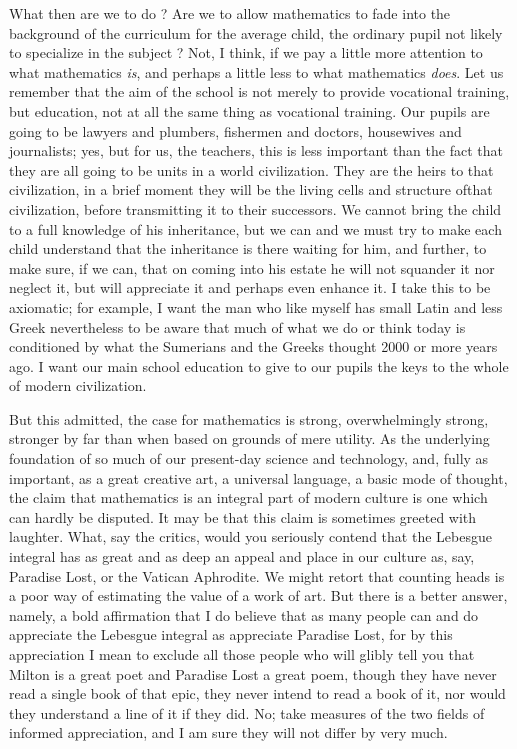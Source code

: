 What then are we to do ? Are we to allow mathematics to fade into the background of the curriculum for the average child, the ordinary pupil not likely to specialize in the subject ? Not, I think, if we pay a little more attention to what mathematics {\em is}, and perhaps a little less to what mathematics {\em does}. Let us remember that the aim of the school is not merely to provide vocational training, but education, not at all the same thing as vocational training. Our pupils are going to be lawyers and plumbers, fishermen and doctors, housewives and journalists; yes, but for us, the teachers, this is less important than the fact that they are all going to be units in a world civilization. They are the heirs to that civilization, in a brief moment they will be the living cells and structure of\pageoriginale that civilization, before transmitting it to their successors. We cannot bring the child to a full knowledge of his inheritance, but we can and we must try to make each child understand that the inheritance is there waiting for him, and further, to make sure, if we can, that on coming into his estate he will not squander it nor neglect it, but will appreciate it and perhaps even enhance it. I take this to be axiomatic; for example, I want the man who like myself has small Latin and less Greek nevertheless to be aware that much of what we do or think today is conditioned by what the Sumerians and the Greeks thought 2000 or more years ago. I want our main school education to give to our pupils the keys to the whole of modern civilization.

But this admitted, the case for mathematics is strong, overwhelmingly strong, stronger by far than when based on grounds of mere utility. As the underlying foundation of so much of our present-day science and technology, and, fully as important, as a great creative art, a universal language, a basic mode of thought, the claim that mathematics is an integral part of modern culture is one which can hardly be disputed. It may be that this claim is sometimes greeted with laughter. What, say the critics, would you seriously contend that the Lebesgue integral has as great and as deep an appeal and place in our culture as, say, Paradise Lost, or the Vatican Aphrodite. We might retort that counting heads is a poor way of estimating the value of a work of art. But there is a better answer, namely, a bold affirmation that I do believe that as many people can and do appreciate the Lebesgue integral as appreciate Paradise Lost, for by this appreciation I mean to exclude all those people who will glibly tell you that Milton is a great poet and Paradise Lost a great poem, though they have never read a single book of that epic, they never intend to read a book of it, nor would they understand a line of it if they did. No; take measures of the two fields of informed appreciation, and I am sure they will not differ by very much.

